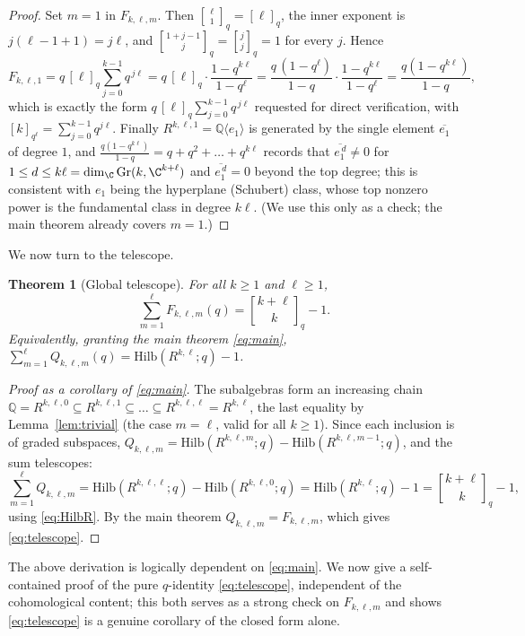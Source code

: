 \documentclass{amsart}
\newtheorem{theorem}{Theorem}
\theoremstyle{definition}
\newcommand{\Gr}{\mathrm{Gr}}
\newcommand{\Hilb}{\mathrm{Hilb}}
\newcommand{\qbin}[2]{\genfrac{[}{]}{0pt}{}{#1}{#2}_q}
\newcommand{\Q}{\mathbb{Q}}
\newcommand{\rkl}{R^{k,\ell}}
\newcommand{\Rklm}{R^{k,\ell,m}}
\begin{document}
\begin{proof}
Set $m=1$ in $F_{k,\ell,m}$. Then $\qbin{\ell}{1}=[\ell]_q$, the inner exponent is
$j(\ell-1+1)=j\ell$, and $\qbin{1+j-1}{j}=\qbin{j}{j}=1$ for every $j$. Hence
\[
F_{k,\ell,1}=q\,[\ell]_q\sum_{j=0}^{k-1}q^{\,j\ell}
=q\,[\ell]_q\cdot\frac{1-q^{k\ell}}{1-q^{\ell}}
=\frac{q\,(1-q^{\ell})}{1-q}\cdot\frac{1-q^{k\ell}}{1-q^{\ell}}
=\frac{q(1-q^{k\ell})}{1-q},
\]
which is exactly the form $q\,[\ell]_q\sum_{j=0}^{k-1}q^{\,j\ell}$ requested
for direct verification, with $[k]_{q^{\ell}}=\sum_{j=0}^{k-1}q^{j\ell}$.
Finally $R^{k,\ell,1}=\Q\langle e_1\rangle$ is generated by the single element
$\overline{e_1}$ of degree $1$, and $\frac{q(1-q^{k\ell})}{1-q}=q+q^2+\dots+q^{k\ell}$
records that $\overline{e_1^{\,d}}\ne0$ for $1\le d\le k\ell=\dim_{\C}\Gr(k,\C^{k+\ell})$
and $\overline{e_1^{\,d}}=0$ beyond the top degree; this is consistent with $e_1$
being the hyperplane (Schubert) class, whose top nonzero power is the fundamental
class in degree $k\ell$. (We use this only as a check; the main theorem already
covers $m=1$.)
\end{proof}

We now turn to the telescope.

\begin{theorem}[Global telescope]\label{thm:telescope}
For all $k\ge1$ and $\ell\ge1$,
\begin{equation}\label{eq:telescope}
\sum_{m=1}^{\ell}F_{k,\ell,m}(q)=\qbin{k+\ell}{k}-1 .
\end{equation}
Equivalently, granting the main theorem \eqref{eq:main},
$\sum_{m=1}^{\ell}Q_{k,\ell,m}(q)=\Hilb(\rkl;q)-1$.
\end{theorem}

\begin{proof}[Proof as a corollary of \eqref{eq:main}]
The subalgebras form an increasing chain
$\Q=R^{k,\ell,0}\subseteq R^{k,\ell,1}\subseteq\dots\subseteq R^{k,\ell,\ell}=\rkl$,
the last equality by Lemma~\ref{lem:trivial} (the case $m=\ell$, valid for all
$k\ge1$). Since each inclusion is of graded subspaces,
$Q_{k,\ell,m}=\Hilb(\Rklm;q)-\Hilb(R^{k,\ell,m-1};q)$, and the sum telescopes:
\[
\sum_{m=1}^{\ell}Q_{k,\ell,m}
=\Hilb(R^{k,\ell,\ell};q)-\Hilb(R^{k,\ell,0};q)
=\Hilb(\rkl;q)-1=\qbin{k+\ell}{k}-1,
\]
using \eqref{eq:HilbR}. By the main theorem $Q_{k,\ell,m}=F_{k,\ell,m}$, which gives
\eqref{eq:telescope}.
\end{proof}

The above derivation is logically dependent on \eqref{eq:main}. We now give a
self-contained proof of the pure $q$-identity \eqref{eq:telescope}, independent of
the cohomological content; this both serves as a strong check on $F_{k,\ell,m}$ and
shows \eqref{eq:telescope} is a genuine corollary of the closed form alone.
\end{document}
